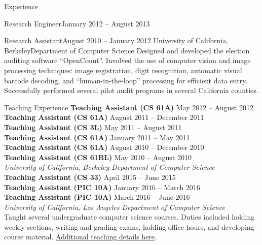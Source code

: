 \documentclass{resume}
\begin{document}
\begin{component}{Experience}
    \begin{position}{Research Engineer}{January 2012 -- August 2013}
        {}{}{}
    \end{position}

\vspace{-3.25em}

    \begin{position}{Research Assistant}{August 2010 -- January 2012}
        {University of California, Berkeley}{Department of Computer Science}
    {Designed and developed the election auditing software ``OpenCount''.
Involved the use of computer vision and image processing techniques: image registration, digit recognition, automatic visual barcode decoding, and ``human-in-the-loop'' processing for efficient data entry.
Successfully performed several pilot audit programs in several California counties.}
    \end{position}
    
\end{component}

\vspace{-1.5em}

\begin{component}{Teaching Experience}
    \textbf{Teaching Assistant (CS 61A)} \hfill May 2012 -- August 2012 \\
    \textbf{Teaching Assistant (CS 61A)} \hfill August 2011 -- December 2011 \\
    \textbf{Teaching Assistant (CS 3L)} \hfill May 2011 -- August 2011 \\
    \textbf{Teaching Assistant (CS 61A)} \hfill January 2011 -- May 2011 \\
    \textbf{Teaching Assistant (CS 61A)} \hfill August 2010 -- December 2010 \\
    \textbf{Teaching Assistant (CS 61BL)} \hfill May 2010 -- August 2010 \\
        \textit{University of California, Berkeley \hfill Department of Computer Science}\\
    \textbf{Teaching Assistant (CS 33)} \hfill April 2015 -- June 2015 \\
    \textbf{Teaching Assistant (PIC 10A)} \hfill January 2016 -- March 2016 \\
    \textbf{Teaching Assistant (PIC 10A)} \hfill March 2016 -- June 2016 \\
        \textit{University of California, Los Angeles \hfill Department of Computer Science}\\
        Taught several undergraduate computer science courses. Duties included holding weekly sections, writing and grading exams, holding office hours, and developing course material.
        \href{http://eric-kim.net/eric-kim-net/teaching.html}{Additional teaching details here}.
\end{component}
\end{document}
